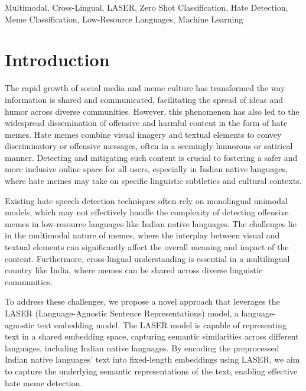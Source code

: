 \documentclass{ieeeaccess}
\begin{document}
\begin{keywords}
Multimodal, Cross-Lingual, LASER, Zero Shot Classification, Hate Detection, Meme Classification, Low-Resource Languages, Machine Learning
\end{keywords}

\titlepgskip=-15pt

\maketitle

\section{Introduction}
\label{sec:introduction}

The rapid growth of social media and meme culture has transformed the way information is shared and communicated, facilitating the spread of ideas and humor across diverse communities. However, this phenomenon has also led to the widespread dissemination of offensive and harmful content in the form of hate memes. Hate memes combine visual imagery and textual elements to convey discriminatory or offensive messages, often in a seemingly humorous or satirical manner. Detecting and mitigating such content is crucial to fostering a safer and more inclusive online space for all users, especially in Indian native languages, where hate memes may take on specific linguistic subtleties and cultural contexts.

Existing hate speech detection techniques often rely on monolingual unimodal models, which may not effectively handle the complexity of detecting offensive memes in low-resource languages like Indian native languages. The challenges lie in the multimodal nature of memes, where the interplay between visual and textual elements can significantly affect the overall meaning and impact of the content. Furthermore, cross-lingual understanding is essential in a multilingual country like India, where memes can be shared across diverse linguistic communities.

To address these challenges, we propose a novel approach that leverages the LASER (Language-Agnostic Sentence Representations) \cite{b1} model, a language-agnostic text embedding model. The LASER model is capable of representing text in a shared embedding space, capturing semantic similarities across different languages, including Indian native languages. By encoding the preprocessed Indian native languages' text into fixed-length embeddings using LASER, we aim to capture the underlying semantic representations of the text, enabling effective hate meme detection.
\end{document}
